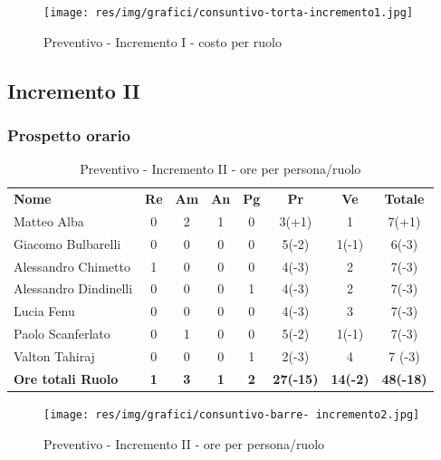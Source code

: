 \begin{figure} [h!]
	\centering
	\texttt{[image: res/img/grafici/consuntivo-torta-incremento1.jpg]}
	\caption{Preventivo - Incremento I - costo per ruolo} 
\end{figure}


\newpage
\subsection{Incremento II}
\subsubsection{Prospetto orario}

\begin{table} [h!]
	\begin{center}
		\begin{tabular} { m{3.5cm} c c c c c c c }
			\rowcolor{lightgray}
			\textbf{Nome} & \textbf{Re} & \textbf{Am} & \textbf{An} & \textbf{Pg} & \textbf{Pr} & \textbf{Ve} & \textbf{Totale} \\
			Matteo Alba & 0 & 2 & 1 & 0 & 3(+1) & 1 & 7(+1) \\
			Giacomo Bulbarelli & 0 & 0 & 0 & 0 & 5(-2) & 1(-1) & 6(-3) \\
			Alessandro Chimetto & 1 & 0 & 0 & 0 & 4(-3) & 2 & 7(-3) \\
			Alessandro Dindinelli & 0 & 0 & 0 & 1 & 4(-3) & 2 & 7(-3) \\
			Lucia Fenu & 0 & 0 & 0 & 0 & 4(-3) & 3 & 7(-3) \\
			Paolo Scanferlato & 0 & 1 & 0 & 0 & 5(-2) & 1(-1) & 7(-3) \\
			Valton Tahiraj & 0 & 0 & 0 & 1 & 2(-3) & 4 & 7 (-3)\\
			\textbf{Ore totali Ruolo} & \textbf{1} & \textbf{3} & \textbf{1} & \textbf{2} & \textbf{27(-15)}& \textbf{14(-2)} & \textbf{48(-18)}
		\end{tabular}
		\caption{Preventivo - Incremento II - ore per persona/ruolo}
	\end{center}
\end{table}
\begin{figure} [h!]
	\centering
	\texttt{[image: res/img/grafici/consuntivo-barre- incremento2.jpg]}
	\caption{Preventivo - Incremento II - ore per persona/ruolo} 
\end{figure}

\newpage

